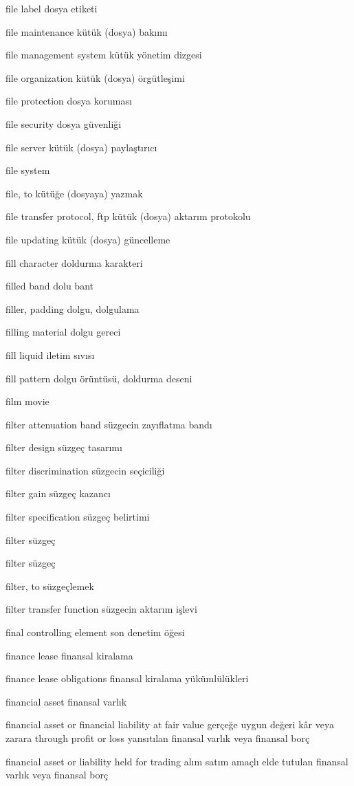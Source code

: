 \documentclass[12pt,fleqn]{article}\usepackage{../../common}
\begin{document}
file label dosya etiketi

file maintenance kütük (dosya) bakımı

file management system kütük yönetim dizgesi

file organization kütük (dosya) örgütleşimi

file protection dosya koruması

file security dosya güvenliği

file server kütük (dosya) paylaştırıcı

file system

file, to kütüğe (dosyaya) yazmak

file transfer protocol, ftp kütük (dosya) aktarım protokolu

file updating kütük (dosya) güncelleme

fill character doldurma karakteri

filled band dolu bant

filler, padding dolgu, dolgulama

filling material dolgu gereci

fill liquid iletim sıvısı

fill pattern dolgu örüntüsü, doldurma deseni

film movie

filter attenuation band süzgecin zayıflatma bandı

filter design süzgeç tasarımı

filter discrimination süzgecin seçiciliği

filter gain süzgeç kazancı

filter specification süzgeç belirtimi

filter süzgeç

filter süzgeç

filter, to süzgeçlemek

filter transfer function süzgecin aktarım işlevi

final controlling element son denetim öğesi

finance lease finansal kiralama

finance lease obligations finansal kiralama yükümlülükleri

financial asset finansal varlık

financial asset or financial liability at fair value gerçeğe uygun değeri kâr veya zarara through profit or loss yansıtılan finansal varlık veya finansal borç

financial asset or liability held for trading alım satım amaçlı elde tutulan finansal varlık veya finansal borç
\end{document}

